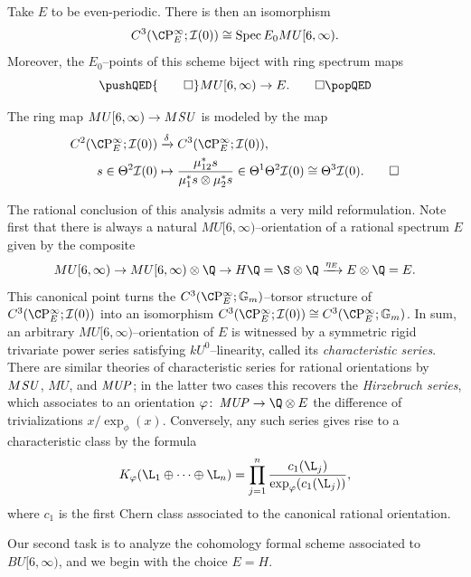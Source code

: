 \begin{corollary}\label{BU6Triumvirate}
Take \(E\) to be even-periodic.
There is then an isomorphism \[C^3(\CP^\infty_E; \sheaf I(0)) \cong \Spec E_0 MU[6, \infty).\]
Moreover, the \(E_0\)--points of this scheme biject with ring spectrum maps\index{orientation!MU six@\(MU[6, \infty)\)} \[\pushQED{\qed}MU[6, \infty) \to E. \qedhere\popQED\]
\end{corollary}

\begin{lemma}\label{MSUToMU6}
The ring map \(MU[6, \infty) \to M\mathit{SU}\) is modeled by the map
\begin{align*}
C^2(\CP^\infty_E; \sheaf I(0)) & \xrightarrow{\delta} C^3(\CP^\infty_E; \sheaf I(0)), \\
s \in \Theta^2 \sheaf I(0) & \mapsto \frac{\mu_{12}^* s}{\mu_1^* s \otimes \mu_2^* s} \in \Theta^1 \Theta^2 \sheaf I(0) \cong \Theta^3 \sheaf I(0). \qed
\end{align*}
\end{lemma}

\begin{remark}
The rational conclusion of this analysis admits a very mild reformulation.
Note first that there is always a natural \(MU[6, \infty)\)--orientation of a rational spectrum \(E\) given by the composite \[MU[6, \infty) \to MU[6, \infty) \otimes \Q \to H\Q = \S \otimes \Q \xrightarrow{\eta_E} E \otimes \Q = E.\]
This canonical point turns the \(C^3(\CP^\infty_E; \Gm)\)--torsor structure of \(C^3(\CP^\infty_E; \sheaf I(0))\) into an isomorphism \(C^3(\CP^\infty_E; \sheaf I(0)) \cong C^3(\CP^\infty_E; \Gm)\).
In sum, an arbitrary \(MU[6, \infty)\)--orientation of \(E\) is witnessed by a symmetric rigid trivariate power series satisfying \(kU^0\)--linearity, called its \textit{characteristic series}.
There are similar theories of characteristic series for rational orientations by \(M\mathit{SU}\), \(MU\), and \(\mathit{MUP}\); in the latter two cases this recovers the \textit{Hirzebruch series}, which associates to an orientation \(\phi\co \MUP \to \Q \otimes E\) the difference of trivializations \(x / \exp_\phi(x)\).
Conversely, any such series gives rise to a characteristic class by the formula \[K_\phi(\L_1 \oplus \cdots \oplus \L_n) = \prod_{j=1}^n \frac{c_1(\L_j)}{\exp_\phi(c_1(\L_j))},\] where \(c_1\) is the first Chern class associated to the canonical rational orientation.
\end{remark}

Our second task is to analyze the cohomology formal scheme associated to \(BU[6, \infty)\), and we begin with the choice \(E = H\).

